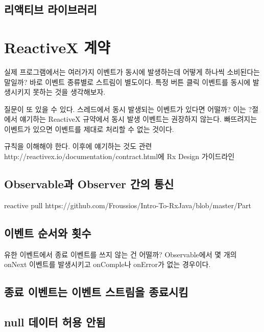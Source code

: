 \documentclass{book}
\begin{document}
\begin{comment}
Java8을 지원하면 내용이 제거되니 지금은 대강만 쓰자.
자바 8부터 지원하는 람다식을 쓸 수 있다.
안드로이드 스튜디오에서 사용방법은 https://github.com/evant/gradle-retrolambda를 참고하자.
\end{comment}

\subsection{리액티브 라이브러리}

\section{ReactiveX 계약}
실제 프로그램에서는 여러가지 이벤트가 동시에 발생하는데 어떻게 하나씩 소비된다는 말일까? 바로 이벤트 종류별로 스트림이 별도이다. 특정 버튼 클릭 이벤트를 동시에 발생시키지 못하는 것을 생각해보자. 

질문이 또 있을 수 있다. 스레드에서 동시 발생되는 이벤트가 있다면 어떨까? 이는 ?절에서 얘기하는 ReactiveX 규약에서 동시 발생 이벤트는 권장하지 않는다. 빠뜨려지는 이벤트가 있으면 이벤트를 제대로 처리할 수 없는 것이다.


규칙을 이해해야 한다. 이후에 얘기하는 것도 관련
http://reactivex.io/documentation/contract.html에 Rx Design 가이드라인

\subsection{Observable과 Observer 간의 통신}
reactive pull
https://github.com/Froussios/Intro-To-RxJava/blob/master/Part%

\subsection{이벤트 순서와 횟수}
유한 이벤트에서 종료 이벤트를 쓰지 않는 건 어떨까? Observable에서 몇 개의 onNext 이벤트를 발생시키고 onComple나 onError가 없는 경우이다.

\subsection{종료 이벤트는 이벤트 스트림을 종료시킴}

\subsection{null 데이터 허용 안됨}
\end{document}
